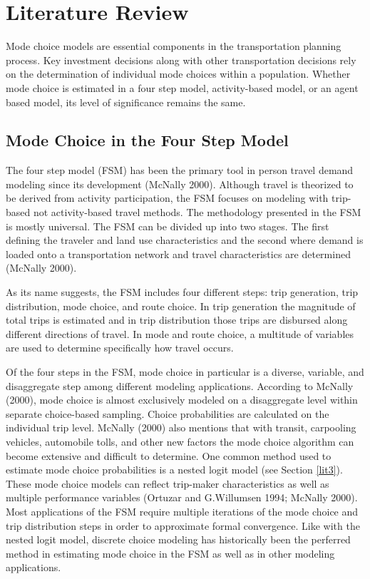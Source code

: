 \documentclass[12pt, oneside, openright]{byuthesis}
\begin{document}
\hypertarget{literature-review}{%
\chapter{Literature Review}\label{literature-review}}

Mode choice models are essential components in the transportation planning process. Key investment decisions along with other transportation decisions rely on the determination of individual mode choices within a population. Whether mode choice is estimated in a four step model, activity-based model, or an agent based model, its level of significance remains the same.

\hypertarget{lit1}{%
\section{Mode Choice in the Four Step Model}\label{lit1}}

The four step model (FSM) has been the primary tool in person travel demand modeling since its development (McNally 2000). Although travel is theorized to be derived from activity participation, the FSM focuses on modeling with trip-based not activity-based travel methods. The methodology presented in the FSM is mostly universal. The FSM can be divided up into two stages. The first defining the traveler and land use characteristics and the second where demand is loaded onto a transportation network and travel characteristics are determined (McNally 2000).

As its name suggests, the FSM includes four different steps: trip generation, trip distribution, mode choice, and route choice. In trip generation the magnitude of total trips is estimated and in trip distribution those trips are disbursed along different directions of travel. In mode and route choice, a multitude of variables are used to determine specifically how travel occurs.

Of the four steps in the FSM, mode choice in particular is a diverse, variable, and disaggregate step among different modeling applications. According to McNally (2000), mode choice is almost exclusively modeled on a disaggregate level within separate choice-based sampling. Choice probabilities are calculated on the individual trip level. McNally (2000) also mentions that with transit, carpooling vehicles, automobile tolls, and other new factors the mode choice algorithm can become extensive and difficult to determine. One common method used to estimate mode choice probabilities is a nested logit model (see Section \ref{lit3}). These mode choice models can reflect trip-maker characteristics as well as multiple performance variables (Ortuzar and G.Willumsen 1994; McNally 2000). Most applications of the FSM require multiple iterations of the mode choice and trip distribution steps in order to approximate formal convergence. Like with the nested logit model, discrete choice modeling has historically been the perferred method in estimating mode choice in the FSM as well as in other modeling applications.
\end{document}
